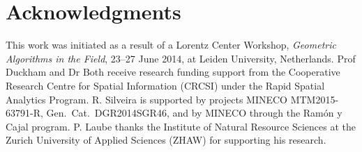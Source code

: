\documentclass[10pt,letterpaper]{article}
\begin{document}


\section*{Acknowledgments}
This work was initiated as a result of a Lorentz Center Workshop, \textit{Geometric Algorithms in the Field}, 23--27 June 2014, at Leiden University, Netherlands. Prof Duckham and Dr Both receive research funding support from the Cooperative Research Centre for Spatial Information (CRCSI) under the Rapid Spatial Analytics Program.
R. Silveira is supported by projects MINECO MTM2015-63791-R, Gen.\ Cat.\ DGR2014SGR46, and by MINECO through the Ram{\'o}n y Cajal program. P. Laube thanks the Institute of Natural Resource Sciences at the Zurich University of Applied Sciences (ZHAW) for supporting his research. 


\nolinenumbers

%


\end{document}
